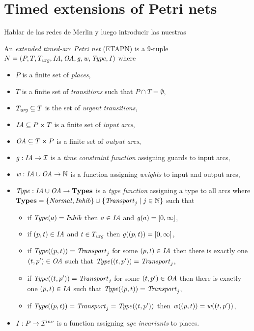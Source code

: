 \section{Timed extensions of Petri nets}

Hablar de las redes de Merlin y luego introducir las nuestras

\begin{definition} \label{defetapn}  
An \emph{extended timed-arc Petri net} 
(ETAPN) is a 9-tuple $N = (P, T, T_{\mathit{urg}}, \mathit{IA},\allowbreak \mathit{OA}, \mathit{g}, \mathit{w}, \mathit{Type}, \mathit{I})$ where 
\begin{itemize}
\item $P$ is a finite set of \emph{places},
\item $T$ is a finite set of \emph{transitions} 
such that $P \cap T = \emptyset$, 
\item $T_{\mathit{urg}} \subseteq T$ is the set of \emph{urgent transitions},
\item $\mathit{IA} \subseteq P \times T$ is a finite set of \emph{input arcs},
\item $\mathit{OA} \subseteq T \times P$ is a finite set of \emph{output arcs},
\item $\mathit{g} : \mathit{IA} \rightarrow \mathcal{I}$ is a \emph{time constraint function} assigning 
guards %
to input arcs,
\item $\mathit{w} : \mathit{IA}\cup \mathit{OA} \rightarrow \mathbb{N}$ is a function assigning \emph{weights} to input and output arcs,
\item $\mathit{Type} : \mathit{IA} \cup \mathit{OA} \rightarrow \mathbf{{Types}}$ is a \emph{type function} assigning a type to all arcs where $\mathbf{{Types}} = \{\mathit{Normal}, \mathit{Inhib}\} \cup \{\mathit{Transport}_j \mid j \in \mathbb{N} \}$ such that  
\begin{itemize}
\item if $\mathit{Type}(a) = \mathit{Inhib}$ then $a \in \mathit{IA}$ and $\mathit{g}(a)=[0,\infty]$, 
\item if $(p,t) \in \mathit{IA}$ and $t \in T_{\mathit{urg}}$ then $\mathit{g}((p,t))=[0,\infty]$,
\item if $\mathit{Type}((p,t)) = \mathit{Transport}_j$ for some $(p,t) \in \mathit{IA}$ then there is exactly one $(t,p^{\prime}) \in \mathit{OA}$ such that $\mathit{Type}((t,p^{\prime})) = 
\mathit{Transport}_j$, 
\item if $\mathit{Type}((t,p^{\prime})) = \mathit{Transport}_j$ for some $(t,p^{\prime}) \in \mathit{OA}$ then there is exactly one $(p,t) \in \mathit{IA}$ such that $\mathit{Type}((p,t)) = 
\mathit{Transport}_j$, 
\item if $\mathit{Type}((p,t)) = \mathit{Transport}_j = \mathit{Type}((t,p^{\prime}))$ 
then $\mathit{w}((p,t))=\mathit{w}((t,p^{\prime}))$,
\end{itemize}
\item $\mathit{I} : P \rightarrow \mathcal{I}^{inv}$ is a function assigning \emph{age invariants} to places.
\end{itemize}
\end{definition}

